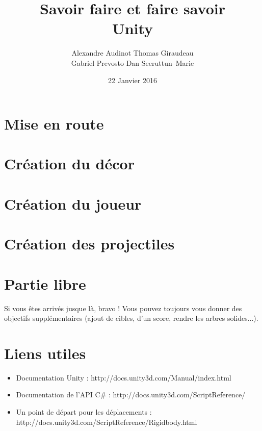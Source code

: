 \documentclass[a4paper]{article}
\title{Savoir faire et faire savoir \\ Unity}
\author{Alexandre Audinot Thomas Giraudeau \\
Gabriel Prevosto Dan Seeruttun--Marie}
\date{22 Janvier 2016}
\begin{document}
\maketitle

\section{Mise en route} 
\section{Création du décor} 
\section{Création du joueur} 
\section{Création des projectiles} 
\section{Partie libre}
Si vous êtes arrivés jusque là, bravo ! Vous pouvez toujours vous donner des objectifs supplémentaires (ajout de cibles, d'un score, rendre les arbres solides...).
\section{Liens utiles}
\begin{itemize}
\item Documentation Unity : http://docs.unity3d.com/Manual/index.html
\item Documentation de l'API C\# : http://docs.unity3d.com/ScriptReference/
\item Un point de départ pour les déplacements : http://docs.unity3d.com/ScriptReference/Rigidbody.html
\end{itemize}
\end{document}
